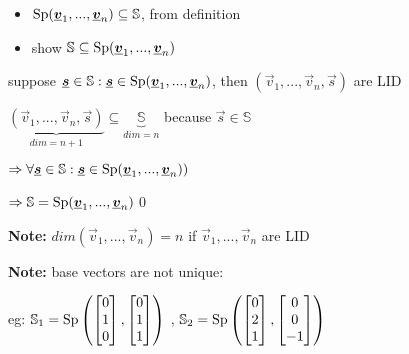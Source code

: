 \begin{itemize}
\item $\operatorname{Sp}(\underline{\boldsymbol {v}}_1,...,\underline{\boldsymbol {v}}_n)\subseteq \mathbb{S}$, from definition
\item show $\mathbb{S}\subseteq \operatorname{Sp}(\underline{\boldsymbol {v}}_1,...,\underline{\boldsymbol {v}}_n)$ 
\end{itemize}
\begin{doublespace}
	suppose $\underline{\boldsymbol {s}}\in\mathbb{S}: \underline{\boldsymbol {s}}\in \operatorname{Sp}(\underline{\boldsymbol {v}}_1,...,\underline{\boldsymbol {v}}_n)$, then $(\vec{v}_1,...,\vec{v}_n,\vec{s})$ are LID 

$\underbrace{(\vec{v}_1,...,\vec{v}_n,\vec{s})}_{dim=n+1}\subseteq \underbrace{\mathbb{S}}_{dim =n}$ because $\vec{s}\in\mathbb{S}$

$\Rightarrow \forall \underline{\boldsymbol {s}}\in\mathbb{S}: \underline{\boldsymbol {s}}\in \operatorname{Sp}(\underline{\boldsymbol {v}}_1,...,\underline{\boldsymbol {v}}_n))$

$\Rightarrow \mathbb{S}= \operatorname{Sp}(\underline{\boldsymbol {v}}_1,...,\underline{\boldsymbol {v}}_n)$\qed

\textbf{Note:} $dim(\vec{v}_1,...,\vec{v}_n)=n $ if $\vec{v}_1,...,\vec{v}_n$ are LID


\textbf{Note:} base vectors are not unique: 

eg: $\mathbb{S}_1=\operatorname{Sp}\left(\begin{bmatrix}0\\1\\0\end{bmatrix},\begin{bmatrix}0\\1\\1\end{bmatrix}\right)$ ,
$\mathbb{S}_2=\operatorname{Sp}\left(\begin{bmatrix}0\\2\\1\end{bmatrix},\begin{bmatrix}0\\0\\-1\end{bmatrix}\right)$



\end{doublespace}
